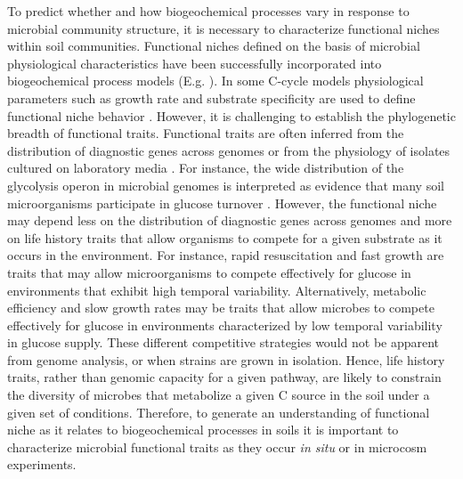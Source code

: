 To predict whether and how biogeochemical processes vary in response to
microbial community structure, it is necessary to characterize functional niches
within soil communities. Functional niches defined on the basis of microbial
physiological characteristics have been successfully incorporated into
biogeochemical process models (E.g. \citep{Wieder2013, Kaiser2014a}). In some
C-cycle models physiological parameters such as growth rate and substrate
specificity are used to define functional niche behavior \citep{Wieder2013}.
However, it is challenging to establish the phylogenetic breadth of functional
traits. Functional traits are often inferred from the distribution of
diagnostic genes across genomes \citep{Berlemont2013} or from the physiology of
isolates cultured on laboratory media \citep{Martiny2013}. For instance, the
wide distribution of the glycolysis operon in microbial genomes is interpreted
as evidence that many soil microorganisms participate in glucose turnover
\citep{McGuire2010}. However, the functional niche may depend less on the
distribution of diagnostic genes across genomes and more on life history traits
that allow organisms to compete for a given substrate as it occurs in the
environment. For instance, rapid resuscitation and fast growth are traits that
may allow microorganisms to compete effectively for glucose in environments
that exhibit high temporal variability. Alternatively, metabolic efficiency and
slow growth rates may be traits that allow microbes to compete effectively for
glucose in environments characterized by low temporal variability in glucose
supply. These different competitive strategies would not be apparent from
genome analysis, or when strains are grown in isolation.  Hence, life history
traits, rather than genomic capacity for a given pathway, are likely to
constrain the diversity of microbes that metabolize a given C source in the
soil under a given set of conditions. Therefore, to generate an understanding
of functional niche as it relates to biogeochemical processes in soils it is
important to characterize microbial functional traits as they occur \textit{in
situ} or in microcosm experiments.


